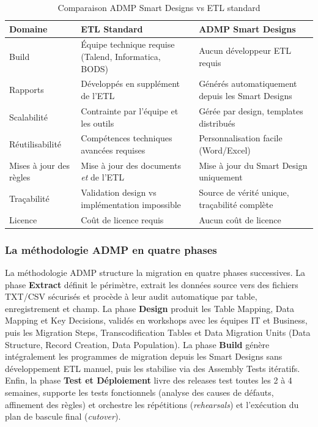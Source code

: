 \begin{table}[H]
\centering
\caption{Comparaison ADMP Smart Designs vs ETL standard}
\label{tab:admp-vs-etl}
\begin{tabularx}{\textwidth}{lXX}
\toprule
\textbf{Domaine} & \textbf{ETL Standard} & \textbf{ADMP Smart Designs} \\
\midrule
Build & Équipe technique requise (Talend, Informatica, BODS) & Aucun développeur ETL requis \\
\addlinespace
Rapports & Développés en supplément de l'ETL & Générés automatiquement depuis les Smart Designs \\
\addlinespace
Scalabilité & Contrainte par l'équipe et les outils & Gérée par design, templates distribués \\
\addlinespace
Réutilisabilité & Compétences techniques avancées requises & Personnalisation facile (Word/Excel) \\
\addlinespace
Mises à jour des règles & Mise à jour des documents \textit{et} de l'ETL & Mise à jour du Smart Design uniquement \\
\addlinespace
Traçabilité & Validation design vs implémentation impossible & Source de vérité unique, traçabilité complète \\
\addlinespace
Licence & Coût de licence requis & Aucun coût de licence \\
\bottomrule
\end{tabularx}
\end{table}

\subsubsection{La méthodologie ADMP en quatre phases}
\label{subsubsec:admp-approche}

La méthodologie ADMP structure la migration en quatre phases successives. La
phase \textbf{Extract} définit le périmètre, extrait les données source vers
des fichiers TXT/CSV sécurisés et procède à leur audit automatique par table,
enregistrement et champ. La phase \textbf{Design} produit les Table Mapping,
Data Mapping et Key Decisions, validés en workshops avec les équipes IT et
Business, puis les Migration Steps, Transcodification Tables et Data Migration
Units (Data Structure, Record Creation, Data Population). La phase
\textbf{Build} génère intégralement les programmes de migration depuis les Smart
Designs sans développement ETL manuel, puis les stabilise via des Assembly Tests
itératifs. Enfin, la phase \textbf{Test et Déploiement} livre des releases test
toutes les 2 à 4 semaines, supporte les tests fonctionnels (analyse des causes
de défauts, affinement des règles) et orchestre les répétitions (\textit{rehearsals})
et l'exécution du plan de bascule final (\textit{cutover}).




